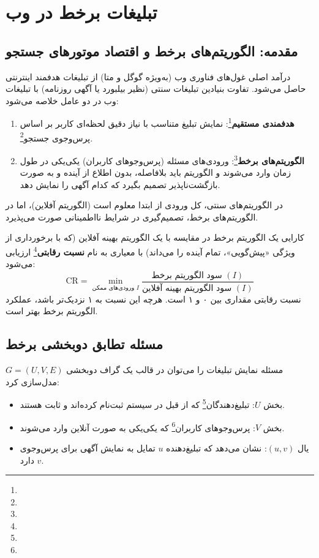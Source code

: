\chapter{تبلیغات برخط در وب \texorpdfstring{}{(Online Advertising \& AdWords)}}
\label{ch:advertising}

\section{مقدمه: الگوریتم‌های برخط و اقتصاد موتورهای جستجو}
درآمد اصلی غول‌های فناوری وب (به‌ویژه گوگل و متا) از تبلیغات هدفمند اینترنتی حاصل می‌شود. تفاوت بنیادین تبلیغات سنتی (نظیر بیلبورد یا آگهی روزنامه) با تبلیغات وب در دو عامل خلاصه می‌شود:
\begin{enumerate}
    \item \textbf{هدفمندی مستقیم}\footnote{}: نمایش تبلیغ متناسب با نیاز دقیق لحظه‌ای کاربر بر اساس پرس‌وجوی جستجو\footnote{}.
    \item \textbf{الگوریتم‌های برخط}\footnote{}: ورودی‌های مسئله (پرس‌وجوهای کاربران) یکی‌یکی در طول زمان وارد می‌شوند و الگوریتم باید بلافاصله، بدون اطلاع از آینده و به صورت بازگشت‌ناپذیر تصمیم بگیرد که کدام آگهی را نمایش دهد.
\end{enumerate}

در الگوریتم‌های سنتی، کل ورودی از ابتدا معلوم است (الگوریتم آفلاین)، اما در الگوریتم‌های برخط، تصمیم‌گیری در شرایط نااطمینانی صورت می‌پذیرد.

\begin{definition}
کارایی یک الگوریتم برخط در مقایسه با یک الگوریتم بهینه آفلاین (که با برخورداری از ویژگی «پیش‌گویی»، تمام آینده را می‌داند) با معیاری به نام \textbf{نسبت رقابتی}\footnote{} ارزیابی می‌شود:
\begin{equation}
\text{CR} = \min_{\text{ورودی‌های ممکن } I} \frac{\text{سود الگوریتم برخط }(I)}{\text{سود الگوریتم بهینه آفلاین }(I)}
\end{equation}
نسبت رقابتی مقداری بین ۰ و ۱ است. هرچه این نسبت به ۱ نزدیک‌تر باشد، عملکرد الگوریتم برخط بهتر است.
\end{definition}

\section{مسئله تطابق دوبخشی برخط \texorpdfstring{}{(Online Bipartite Matching)}}
مسئله نمایش تبلیغات را می‌توان در قالب یک گراف دوبخشی $G = (U, V, E)$ مدل‌سازی کرد:
\begin{itemize}
    \item بخش $U$: تبلیغ‌دهندگان\footnote{} که از قبل در سیستم ثبت‌نام کرده‌اند و ثابت هستند.
    \item بخش $V$: پرس‌وجوهای کاربران\footnote{} که یکی‌یکی به صورت آنلاین وارد می‌شوند.
    \item یال $(u, v)$: نشان می‌دهد که تبلیغ‌دهنده $u$ تمایل به نمایش آگهی برای پرس‌وجوی $v$ دارد.
\end{itemize}

